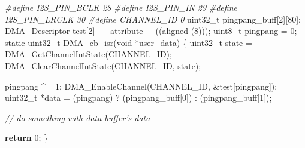 \documentclass[
  12pt,
]{book}
\newenvironment{Shaded}{\begin{snugshade}}{\end{snugshade}}
\newcommand{\CommentTok}[1]{\textcolor[rgb]{0.56,0.35,0.01}{\textit{#1}}}
\newcommand{\ControlFlowTok}[1]{\textcolor[rgb]{0.13,0.29,0.53}{\textbf{#1}}}
\newcommand{\DataTypeTok}[1]{\textcolor[rgb]{0.13,0.29,0.53}{#1}}
\newcommand{\DecValTok}[1]{\textcolor[rgb]{0.00,0.00,0.81}{#1}}
\newcommand{\NormalTok}[1]{#1}
\newcommand{\PreprocessorTok}[1]{\textcolor[rgb]{0.56,0.35,0.01}{\textit{#1}}}
\begin{document}
\begin{Shaded}
\begin{Highlighting}[]
\PreprocessorTok{#define I2S_PIN_BCLK        28}
\PreprocessorTok{#define I2S_PIN_IN          29}
\PreprocessorTok{#define I2S_PIN_LRCLK       30}
\PreprocessorTok{#define CHANNEL_ID  0}
\DataTypeTok{uint32_t}\NormalTok{ pingpang_buff[}\DecValTok{2}\NormalTok{][}\DecValTok{80}\NormalTok{];}
\NormalTok{DMA_Descriptor test[}\DecValTok{2}\NormalTok{] __attribute__((aligned (}\DecValTok{8}\NormalTok{)));}
\DataTypeTok{uint8_t}\NormalTok{ pingpang = }\DecValTok{0}\NormalTok{;}
\DataTypeTok{static} \DataTypeTok{uint32_t}\NormalTok{ DMA_cb_isr(}\DataTypeTok{void}\NormalTok{ *user_data)}
\NormalTok{\{ }
      \DataTypeTok{uint32_t}\NormalTok{ state = DMA_GetChannelIntState(CHANNEL_ID);}
\NormalTok{      DMA_ClearChannelIntState(CHANNEL_ID, state);}

\NormalTok{      pingpang ^= }\DecValTok{1}\NormalTok{;}
\NormalTok{    DMA_EnableChannel(CHANNEL_ID, &test[pingpang]);}
    \DataTypeTok{uint32_t}\NormalTok{ *data = (pingpang) ? (pingpang_buff[}\DecValTok{0}\NormalTok{]) : (pingpang_buff[}\DecValTok{1}\NormalTok{]);}

    \CommentTok{// do something with data-buffer's data}
    
    \ControlFlowTok{return} \DecValTok{0}\NormalTok{;}
\NormalTok{\}}


\end{Highlighting}
\end{Shaded}
\end{document}
